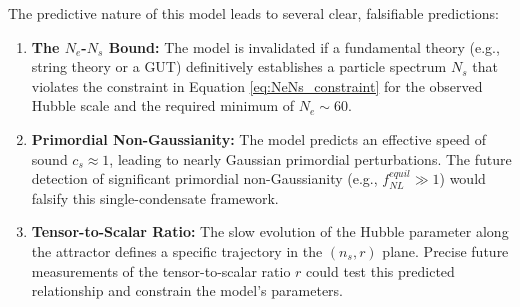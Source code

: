 \documentclass[]{article}
\begin{document}
The predictive nature of this model leads to several clear, falsifiable predictions:
\begin{enumerate}
    \item \textbf{The $N_e$-$N_s$ Bound:} The model is invalidated if a fundamental theory (e.g., string theory or a GUT) definitively establishes a particle spectrum $N_s$ that violates the constraint in Equation \ref{eq:NeNs_constraint} for the observed Hubble scale and the required minimum of $N_e \sim 60$.
    \item \textbf{Primordial Non-Gaussianity:} The model predicts an effective speed of sound $c_s \approx 1$, leading to nearly Gaussian primordial perturbations. The future detection of significant primordial non-Gaussianity (e.g., $f_{NL}^{equil} \gg 1$) would falsify this single-condensate framework.
    \item \textbf{Tensor-to-Scalar Ratio:} The slow evolution of the Hubble parameter along the attractor defines a specific trajectory in the $(n_s, r)$ plane. Precise future measurements of the tensor-to-scalar ratio $r$ could test this predicted relationship and constrain the model's parameters.
\end{enumerate}
\end{document}
